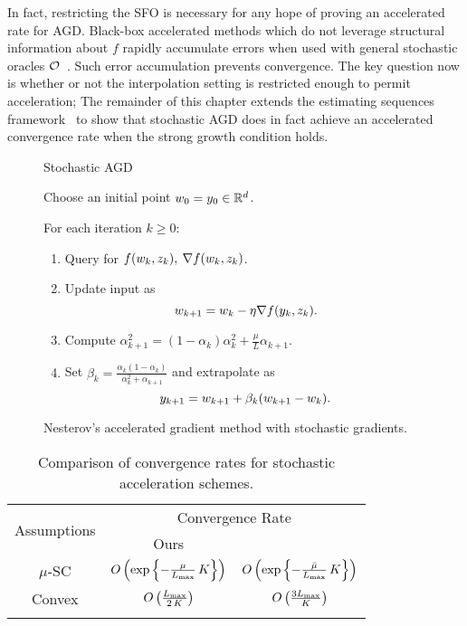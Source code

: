 In fact, restricting the SFO is necessary for any hope of proving an accelerated rate for AGD.
Black-box accelerated methods which do not leverage structural information about \( f \) rapidly accumulate errors when used with general stochastic oracles \( \oracle{} \)~\citep{devolder2014first, schmidt2011convergence}. 
Such error accumulation prevents convergence. 
The key question now is whether or not the interpolation setting is restricted enough to permit acceleration;
The remainder of this chapter extends the estimating sequences framework~\citep{nesterov2004lectures} to show that stochastic AGD does in fact achieve an accelerated convergence rate when the strong growth condition holds.

\begin{figure}[t]
    \centering
    \begin{procedure}{Stochastic AGD}
        \item Choose an initial point \( \w_0 = y_0 \in \R^d \).
        \item For each iteration \( k \geq 0 \):
            \begin{enumerate}
                \item Query \oracle{} for \( f(\wk, \zk), \: \grad(\wk, \zk) \). 
                \item Update input as\vspace{-1ex}%
                \[ \wkk = \wk - \eta \grad(\yk, \zk). \]
                \item Compute 
                    \( \alpha_{k+1}^2 = (1 - \alpha_k)\alpha_k^2 + \frac{\mu}{L} \alpha_{k+1} \).
                \item Set \( \beta_{k} = \frac{\alpha_k (1-\alpha_k)}{\alpha_k^2 + \alpha_{k+1}} \) and extrapolate as
                    \[ \ykk = \wkk + \beta_k (\wkk - \wk).  \] 
            \end{enumerate}
    \end{procedure}
     \caption{Nesterov's accelerated gradient method with stochastic gradients.}%
    \label{procedure:accelerated-sgd}
\end{figure}

\begin{table}[t]
    \centering
    \begin{tabular}{c c c  }\toprule
        \multirow{2}{*}{Assumptions} & \multicolumn{2}{c}{Convergence Rate}\\%
        \cmidrule(lr){2-3} 
                 & \multicolumn{1}{c}{Ours} & \multicolumn{1}{c}{\citet{vaswani2019painless}}\\ \midrule
        \( \mu \)-SC & \( O\rbr{\exp\cbr{- \frac{\mu}{\Lmax} \, K}} \)%
                     & \( O\rbr{\exp\cbr{- \frac{\bar \mu}{\Lmax} \, K}} \) \\ \addlinespace
    Convex       & \( O\rbr{\frac{\Lmax}{2 \, K}} \)%
                 & \( O\rbr{\frac{3 \Lmax}{K}} \)\\ \addlinespace 
        \end{tabular}
        \caption{Comparison of convergence rates for stochastic acceleration schemes.}%
    \label{table:ls-comparison}
\end{table}



